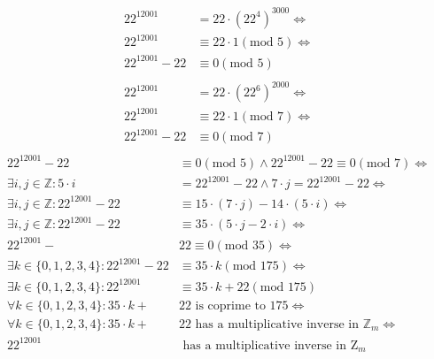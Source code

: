 \documentclass[10pt,\jkfside,a4paper]{article}
\begin{document}
\begin{enumerate}
\begin{equation}
\begin{split}
22^{12001} &= 22\cdot (22^4)^{3000}\Longleftrightarrow\\
22^{12001} &\equiv 22\cdot 1 (\text{mod } 5)\Longleftrightarrow\\
22^{12001} - 22 &\equiv 0 (\text{mod } 5)\\
\end{split}
\end{equation}
\begin{equation}
\begin{split}
22^{12001} &= 22\cdot (22^6)^{2000}\Longleftrightarrow\\
22^{12001} &\equiv 22\cdot 1 (\text{mod } 7)\Longleftrightarrow\\
22^{12001} - 22 &\equiv 0 (\text{mod } 7)\\
\end{split}
\end{equation}
\begin{equation}
\begin{split}
22^{12001} - 22 &\equiv 0 (\text{mod } 5) \wedge 22^{12001} - 22 \equiv 0 (\text{mod } 7)\Longleftrightarrow\\
\exists i, j \in \mathbb{Z}: 5 \cdot i &= 22^{12001} - 22 \wedge 7 \cdot j = 22^{12001} - 22\Longleftrightarrow\\
\exists i, j \in \mathbb{Z}: 22^{12001} - 22 &\equiv 15\cdot(7\cdot j) - 14\cdot(5\cdot i)\Longleftrightarrow\\
\exists i, j \in \mathbb{Z}: 22^{12001} - 22 &\equiv 35\cdot(5\cdot j - 2\cdot i)\Longleftrightarrow\\
22^{12001} - &22 \equiv 0 (\text{mod } 35)\Longleftrightarrow\\
\exists k \in \{0,1,2,3,4\}: 22^{12001} - 22 &\equiv 35\cdot k (\text{mod } 175)\Longleftrightarrow\\
\exists k \in \{0,1,2,3,4\}: 22^{12001} &\equiv 35\cdot k + 22 (\text{mod } 175)\\
\forall k \in \{0,1,2,3,4\}: 35\cdot k + &22 \text{ is coprime to 175} \Longleftrightarrow\\
\forall k \in \{0,1,2,3,4\}: 35\cdot k + &22 \text{ has a multiplicative inverse in }\mathbb{Z}_m \Longleftrightarrow\\
22^{12001} &\text{ has a multiplicative inverse in }\text{Z}_m\\
\end{split}
\end{equation}

\end{enumerate}
\end{document}
